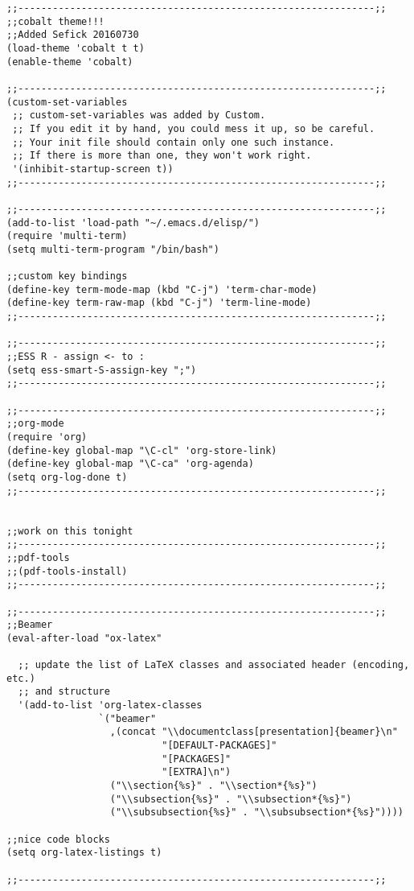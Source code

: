 \documentclass[11pt]{article}
\begin{document}
\begin{verbatim}
;;--------------------------------------------------------------;;
;;cobalt theme!!!
;;Added Sefick 20160730
(load-theme 'cobalt t t)
(enable-theme 'cobalt)

;;--------------------------------------------------------------;;
(custom-set-variables
 ;; custom-set-variables was added by Custom.
 ;; If you edit it by hand, you could mess it up, so be careful.
 ;; Your init file should contain only one such instance.
 ;; If there is more than one, they won't work right.
 '(inhibit-startup-screen t))
;;--------------------------------------------------------------;;

;;--------------------------------------------------------------;;
(add-to-list 'load-path "~/.emacs.d/elisp/")
(require 'multi-term)
(setq multi-term-program "/bin/bash")

;;custom key bindings
(define-key term-mode-map (kbd "C-j") 'term-char-mode)
(define-key term-raw-map (kbd "C-j") 'term-line-mode)
;;--------------------------------------------------------------;;

;;--------------------------------------------------------------;;
;;ESS R - assign <- to :
(setq ess-smart-S-assign-key ";") 
;;--------------------------------------------------------------;;

;;--------------------------------------------------------------;;
;;org-mode
(require 'org)
(define-key global-map "\C-cl" 'org-store-link)
(define-key global-map "\C-ca" 'org-agenda)
(setq org-log-done t)
;;--------------------------------------------------------------;;


;;work on this tonight
;;--------------------------------------------------------------;;
;;pdf-tools
;;(pdf-tools-install)
;;--------------------------------------------------------------;;

;;--------------------------------------------------------------;;
;;Beamer
(eval-after-load "ox-latex"

  ;; update the list of LaTeX classes and associated header (encoding, etc.)
  ;; and structure
  '(add-to-list 'org-latex-classes
                `("beamer"
                  ,(concat "\\documentclass[presentation]{beamer}\n"
                           "[DEFAULT-PACKAGES]"
                           "[PACKAGES]"
                           "[EXTRA]\n")
                  ("\\section{%s}" . "\\section*{%s}")
                  ("\\subsection{%s}" . "\\subsection*{%s}")
                  ("\\subsubsection{%s}" . "\\subsubsection*{%s}"))))

;;nice code blocks
(setq org-latex-listings t)

;;--------------------------------------------------------------;;
\end{verbatim}
\end{document}
